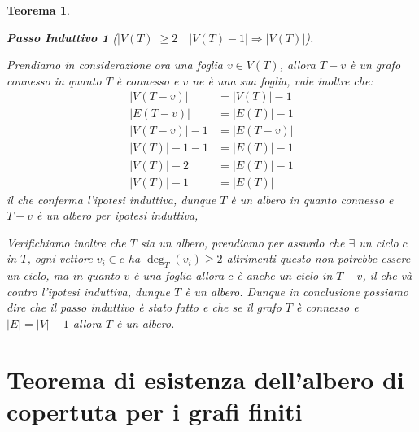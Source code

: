 \documentclass{article}
\makeatletter
\renewenvironment{proof}[1][\proofname]{\par
    \pushQED{\qed}%
    \normalfont \topsep6\p@\@plus6\p@\relax
    \trivlist
    \item\relax
    {\itshape
    #1\@addpunct{.}}\hspace\labelsep\ignorespaces
    }{%
    \popQED\endtrivlist\@endpefalse
}
\newtheorem{theorem}{Teorema}[part]
\newtheorem*{step}{Passo Induttivo}
\makeatother
\begin{document}
\begin{theorem}
\begin{proof}
\begin{enumerate}
\begin{step}[$|V(T)|\geq2\quad |V(T)-1|\Longrightarrow |V(T)|$]
\begin{proof}
                            \end{proof}
                            Prendiamo in considerazione ora una foglia \(v\in V(T)\), allora \(T-v\) è un grafo connesso in quanto \(T\) è connesso e \(v\) ne è una sua foglia, vale inoltre che: \[
                                \begin{aligned}
                                    |V(T-v)|&=|V(T)|-1\\
                                    |E(T-v)|&=|E(T)|-1\\
                                    |V(T-v)|-1&=|E(T-v)|\\
                                    |V(T)|-1-1&=|E(T)|-1\\
                                    |V(T)|-2&=|E(T)|-1\\
                                    |V(T)|-1&=|E(T)|
                                \end{aligned} 
                            \]
                            il che conferma l'ipotesi induttiva, dunque \(T\) è un albero in quanto connesso e \(T-v\) è un albero per ipotesi induttiva,
                            \popQED{}
                        \end{step}
                        \begin{proof}[]
                            Verifichiamo inoltre che \(T\) sia un albero, prendiamo per assurdo che \(\exists\) un ciclo \(c\) in \(T\), ogni vettore \(v_i\in c\) ha \(\deg_T(v_i)\geq 2\) altrimenti questo non potrebbe essere un ciclo, ma in quanto \(v\) è una foglia allora \(c\) è anche un ciclo in \(T-v\), il che và contro l'ipotesi induttiva, dunque \(T\) è un albero.
                        \end{proof}
                        Dunque in conclusione possiamo dire che il passo induttivo è stato fatto e che se il grafo \(T\) è connesso e \(|E|=|V|-1\) allora \(T\) è un albero.
                \end{enumerate}
                \pushQED{}
            \end{proof}
            \raggedleft{{\ensuremath{\blacksquare}}}
        \end{theorem}
\part{Teorema di esistenza dell'albero di copertuta per i grafi finiti}
\end{document}
